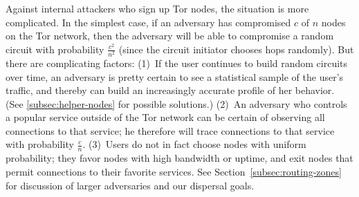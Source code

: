 \documentclass{llncs}
\newenvironment{tightlist}{\begin{list}{$\bullet$}{
  \setlength{\itemsep}{0mm}
    \setlength{\parsep}{0mm}
    }}{\end{list}}
\begin{document}
Against internal attackers who sign up Tor nodes, the situation is more
complicated.  In the simplest case, if an adversary has compromised $c$ of
$n$ nodes on the Tor network, then the adversary will be able to compromise
a random circuit with probability $\frac{c^2}{n^2}$ (since the circuit
initiator chooses hops randomly).  But there are
complicating factors:
(1)~If the user continues to build random circuits over time, an adversary
  is pretty certain to see a statistical sample of the user's traffic, and
  thereby can build an increasingly accurate profile of her behavior.  (See
  \ref{subsec:helper-nodes} for possible solutions.)
(2)~An adversary who controls a popular service outside of the Tor network
  can be certain of observing all connections to that service; he
  therefore will trace connections to that service with probability
  $\frac{c}{n}$.
(3)~Users do not in fact choose nodes with uniform probability; they
  favor nodes with high bandwidth or uptime, and exit nodes that
  permit connections to their favorite services. 
See Section~\ref{subsec:routing-zones} for discussion of larger
adversaries and our dispersal goals.


%
\end{document}
